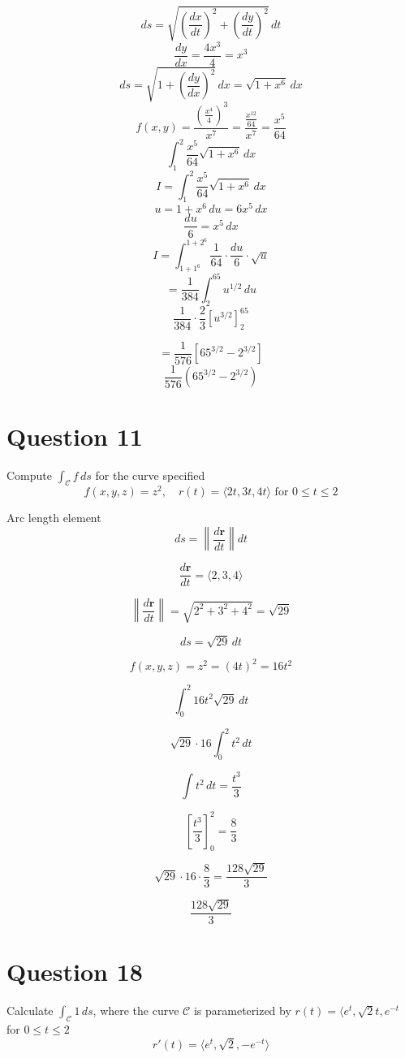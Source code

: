 \documentclass[hidelinks]{article}
\begin{document}
\[
ds = \sqrt{ \left( \frac{dx}{dt} \right)^2 + \left( \frac{dy}{dt} \right)^2 } \, dt
\]
\[
\frac{dy}{dx} = \frac{4x^3}{4} = x^3
\]
\[
ds = \sqrt{ 1 + \left( \frac{dy}{dx} \right)^2 } \, dx = \sqrt{1 + x^6} \, dx
\]
\[
f(x, y) = \frac{ \left( \frac{x^4}{4} \right)^3 }{ x^7 } = \frac{ \frac{x^{12}}{64} }{ x^7 } = \frac{x^5}{64}
\]
\[
\int_1^2 \frac{x^5}{64} \sqrt{1 + x^6} \, dx
\]
\[
I = \int_1^2 \frac{x^5}{64} \sqrt{1 + x^6} \, dx
\]
\[
u = 1 + x^6 \, du = 6x^5 \, dx
\]
\[
\frac{du}{6} = x^5 \, dx
\]
\[
I = \int_{1+1^6}^{1+2^6} \frac{1}{64} \cdot \frac{du}{6} \cdot \sqrt{u}
\]
\[
= \frac{1}{384} \int_2^{65} u^{1/2} \, du
\]
\[
\frac{1}{384} \cdot \frac{2}{3} \left[ u^{3/2} \right]_2^{65}
\]

\[
= \frac{1}{576} \left[ 65^{3/2} - 2^{3/2} \right]
\]
\[
\frac{1}{576} \left( 65^{3/2} - 2^{3/2} \right)
\]
\newpage

\section*{Question 11}
Compute $\int_\mathcal{C} f \, ds$ for the curve specified
\[
    f(x,y,z) = z^2, \quad r(t) = \langle 2t, 3t, 4t \rangle \text{ for } 0 \leq t \leq 2
\]

Arc length element
\[
ds = \left\| \frac{d\mathbf{r}}{dt} \right\| dt
\]

\[
\frac{d\mathbf{r}}{dt} = \langle 2, 3, 4 \rangle
\]

\[
\left\| \frac{d\mathbf{r}}{dt} \right\| = \sqrt{2^2 + 3^2 + 4^2} = \sqrt{29}
\]

\[
ds = \sqrt{29} \, dt
\]

\[
f(x,y,z) = z^2 = (4t)^2 = 16t^2
\]

\[
\int_0^2 16t^2 \sqrt{29} \, dt
\]

\[
\sqrt{29} \cdot 16 \int_0^2 t^2 \, dt
\]

\[
\int t^2 \, dt = \frac{t^3}{3}
\]

\[
\left[ \frac{t^3}{3} \right]_0^2 = \frac{8}{3}
\]

\[
\sqrt{29} \cdot 16 \cdot \frac{8}{3} = \frac{128 \sqrt{29}}{3}
\]

\[
\frac{128 \sqrt{29}}{3}
\]
\newpage

\section*{Question 18}
Calculate $\int_\mathcal{C} 1 \, ds$, where the curve $\mathcal{C}$ is parameterized by $r(t) = \langle e^t, \sqrt{2}t, e^{-t}$ for $0 \leq t \leq 2$
\[
r'(t) = \langle e^t, \sqrt{2}, -e^{-t} \rangle
\]
\end{document}
